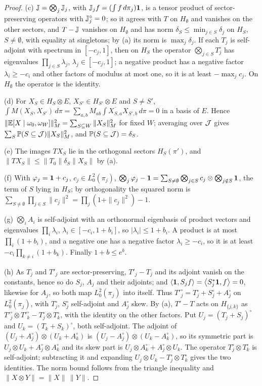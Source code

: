 \begin{proof}
(c) $\mathbb J=\bigotimes_j\mathbb J_j$, with $\mathbb J_jf=(\int f\,d\pi_j)\mathbf 1$, is a
tensor product of sector-preserving operators with $\mathbb J_j^\circ=0$; so it
agrees with $T$ on $H_\emptyset$ and vanishes on the other sectors, and
$T-\mathbb J$ vanishes on $H_\emptyset$ and has norm
$\delta_S\le\min_{j\in S}\delta_j$ on $H_S$, $S\ne\emptyset$, with equality at
singletons; by (a) its norm is $\max_j\delta_j$. If each $T_j$ is self-adjoint
with spectrum in $[-c_j,1]$, then on $H_S$ the operator
$\bigotimes_{j\in S}T_j^\circ$ has eigenvalues $\prod_{j\in S}\lambda_j$,
$\lambda_j\in[-c_j,1]$; a negative product has a negative factor
$\lambda_i\ge-c_i$ and other factors of modulus at most one, so it is at least
$-\max_jc_j$. On $H_\emptyset$ the operator is the identity.

(d) For $X_S\in H_S\otimes E$, $X_{S'}\in H_{S'}\otimes E$ and $S\ne S'$,
$\int M(X_S,X_{S'})\,d\pi=\sum_{a,b}M_{ab}\int\overline{X_{S,a}}X_{S',b}\,d\pi=0$
in a basis of $E$. Hence
$\|\mathbb E[X\mid\omega_0,\omega_W]\|_M^2=\sum_{S\subseteq W}\|X_S\|_M^2$ for fixed $W$;
averaging over $\mathcal J$ gives $\sum_S\mathbb P(S\subseteq\mathcal J)\|X_S\|_M^2$, and
$\mathbb P(S\subseteq\mathcal J)=\delta_S$.

(e) The images $TX_S$ lie in the orthogonal sectors $H_S(\pi')$, and
$\|TX_S\|\le\|T_0\|\delta_S\|X_S\|$ by (a).

(f) With $\varphi_j=\mathbf 1+c_j$, $c_j\in L^2_0(\pi_j)$,
$\bigotimes_j\varphi_j-\mathbf 1=\sum_{S\ne\emptyset}\bigotimes_{j\in S}c_j\otimes
\bigotimes_{j\notin S}\mathbf 1$, the term of $S$ lying in $H_S$; by orthogonality
the squared norm is $\sum_{S\ne\emptyset}\prod_{j\in S}\|c_j\|^2=
\prod_j(1+\|c_j\|^2)-1$.

(g) $\bigotimes_iA_i$ is self-adjoint with an orthonormal eigenbasis of product
vectors and eigenvalues $\prod_i\lambda_i$, $\lambda_i\in[-c_i,1+b_i]$, so
$|\lambda_i|\le1+b_i$. A product is at most $\prod_i(1+b_i)$, and a negative one
has a negative factor $\lambda_i\ge-c_i$, so it is at least
$-c_i\prod_{k\ne i}(1+b_k)$. Finally $1+b\le e^b$.

(h) As $T_j$ and $T'_j$ are sector-preserving, $T'_j-T_j$ and its adjoint
vanish on the constants, hence so do $S_j$, $A_j$ and their adjoints; and
$\left\langle \mathbf 1,S_jf\right\rangle=\left\langle S_j^*\mathbf 1,f\right\rangle=0$, likewise for $A_j$, so both map
$L^2_0(\pi_j)$ into itself. Thus $T'^\circ_j=T^\circ_j+S^\circ_j+A^\circ_j$ on
$L^2_0(\pi_j)$, with $T^\circ_j$, $S^\circ_j$ self-adjoint and $A^\circ_j$ skew. By
(a), $T'-T$ acts on $H_{\{j,k\}}$ as $T'^\circ_j\otimes T'^\circ_k-T^\circ_j\otimes
T^\circ_k$, with the identity on the other factors. Put
$U_j=(T_j+S_j)^\circ$ and $U_k=(T_k+S_k)^\circ$, both self-adjoint. The adjoint
of $(U_j+A^\circ_j)\otimes(U_k+A^\circ_k)$ is $(U_j-A^\circ_j)\otimes(U_k-A^\circ_k)$,
so its symmetric part is $U_j\otimes U_k+A^\circ_j\otimes A^\circ_k$ and its skew
part is $U_j\otimes A^\circ_k+A^\circ_j\otimes U_k$. The operator
$T^\circ_j\otimes T^\circ_k$ is self-adjoint; subtracting it and expanding
$U_j\otimes U_k-T^\circ_j\otimes T^\circ_k$ gives the two identities. The norm
bound follows from the triangle inequality and $\|X\otimes Y\|=\|X\|\,\|Y\|$.
\end{proof}

